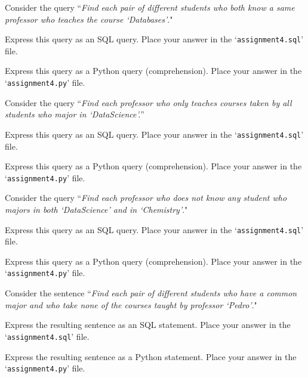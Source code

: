 \documentclass[12pt]{exam}
\newcommand{\<}{\langle}
\renewcommand{\>}{\rangle}
\theoremstyle{definition}   %
\begin{document}
\begin{questions}
\question
Consider the query ``\emph{Find each pair of different students who both know a same professor who teaches the course `Databases'}."

\begin{parts}
\item  Express this query as an SQL query.   Place your answer in the `{\tt assignment4.sql}' file.
\item  Express this query as a Python query (comprehension).   Place your answer in the `{\tt assignment4.py}' file.
\end{parts}

\question
Consider the query ``\emph{Find each professor who only teaches courses taken by all students who major in `DataScience'.}''

\begin{parts}
\item  Express this query as an SQL query.   Place your answer in the `{\tt assignment4.sql}' file.
\item  Express this query as a Python query (comprehension).   Place your answer in the `{\tt assignment4.py}' file.
\end{parts}

\question
Consider the query ``\emph{Find each professor who does not know any student who majors in both `DataScience' and in `Chemistry'}."
\begin{parts}
\item  Express this query as an SQL query.   Place your answer in the `{\tt assignment4.sql}' file.
\item  Express this query as a Python query (comprehension).   Place your answer in the `{\tt assignment4.py}' file.
\end{parts}

\question\label{sentenceThree} Consider the sentence ``\emph{Find each pair of different students who have a common major and who take none of the courses taught by professor `Pedro'}."

\begin{parts}
\item  Express the resulting sentence as an SQL statement.   Place your answer in the `{\tt assignment4.sql}' file.
\item  Express the resulting sentence as a Python statement.   Place your answer in the `{\tt assignment4.py}' file.
\end{parts}


\end{questions}
\end{document}
